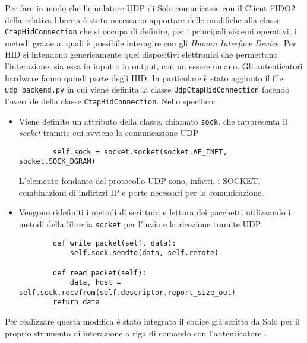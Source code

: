 Per fare in modo che l'emulatore UDP di Solo comunicasse con il Client FIDO2 della relativa libreria è stato necessario apportare delle modifiche alla classe \verb*|CtapHidConnection| che si occupa di definire, per i principali sistemi operativi, i metodi grazie ai quali è possibile interagire con gli \emph{Human Interface Device}. Per HID si intendono genericamente quei dispositivi elettronici che permettono l'interazione, sia essa in input o in output, con un essere umano. Gli autenticatori hardware fanno quindi parte degli HID. 
In particolare è stato aggiunto il file \verb*|udp_backend.py| in cui viene definita la classe \verb*|UdpCtapHidConnection| facendo l'override della classe \verb*|CtapHidConnection|. Nello specifico:
\begin{itemize}
	\item Viene definito un attributo della classe, chiamato \verb*|sock|, che rappresenta il \emph{socket} tramite cui avviene la comunicazione UDP
	\begin{verbatim}
		self.sock = socket.socket(socket.AF_INET, socket.SOCK_DGRAM)
	\end{verbatim}
	L'elemento fondante del protocollo UDP sono, infatti, i SOCKET, combinazioni di indirizzi IP e porte necessari per la comunicazione.
	\item Vengono ridefiniti i metodi di scrittura e lettura dei pacchetti utilizzando i metodi della libreria \verb*|socket| per l'invio e la ricezione tramite UDP
	\begin{verbatim}
        def write_packet(self, data):
            self.sock.sendto(data, self.remote)
		
        def read_packet(self):
            data, host = self.sock.recvfrom(self.descriptor.report_size_out)
        return data
	\end{verbatim}
\end{itemize}
Per realizzare questa modifica è stato integrato il codice già scritto da Solo per il proprio strumento di interazione a riga di comando con l'autenticatore \cite{solo1-cli:udp_backend}.